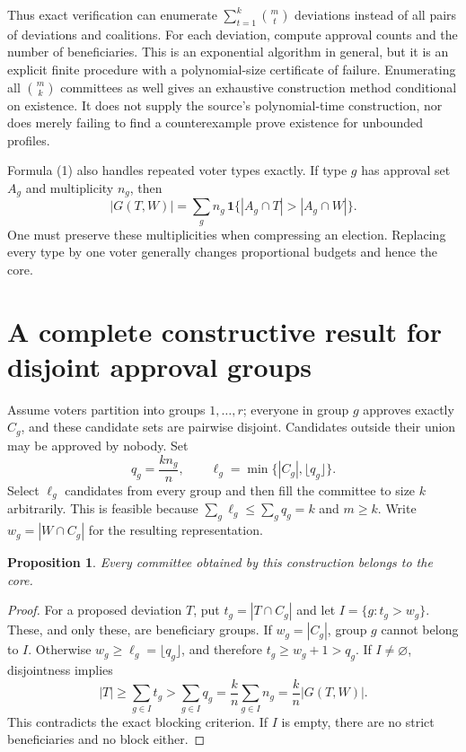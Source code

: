 \documentclass[11pt]{article}
\newtheorem{proposition}{Proposition}
\begin{document}
Thus exact verification can enumerate $\sum_{t=1}^k\binom mt$ deviations
instead of all pairs of deviations and coalitions. For each deviation,
compute approval counts and the number of beneficiaries. This is an
exponential algorithm in general, but it is an explicit finite procedure
with a polynomial-size certificate of failure. Enumerating all
$\binom mk$ committees as well gives an exhaustive construction method
conditional on existence. It does not supply the source's polynomial-time
construction, nor does merely failing to find a counterexample prove
existence for unbounded profiles.

Formula (1) also handles repeated voter types exactly. If type $g$ has
approval set $A_g$ and multiplicity $n_g$, then
\[
 |G(T,W)|=\sum_g n_g\,
 \mathbf 1\{|A_g\cap T|>|A_g\cap W|\}.
 \tag{2}
\]
One must preserve these multiplicities when compressing an election.
Replacing every type by one voter generally changes proportional budgets
and hence the core.

\section*{A complete constructive result for disjoint approval groups}
Assume voters partition into groups $1,\ldots,r$; everyone in group $g$
approves exactly $C_g$, and these candidate sets are pairwise disjoint.
Candidates outside their union may be approved by nobody. Set
\[
 q_g=\frac{k n_g}{n},\qquad
 \ell_g=\min\{|C_g|,\lfloor q_g\rfloor\}.
\]
Select $\ell_g$ candidates from every group and then fill the committee
to size $k$ arbitrarily. This is feasible because
$\sum_g\ell_g\leq\sum_g q_g=k$ and $m\geq k$. Write $w_g=|W\cap C_g|$
for the resulting representation.

\begin{proposition}
Every committee obtained by this construction belongs to the core.
\end{proposition}
\begin{proof}
For a proposed deviation $T$, put $t_g=|T\cap C_g|$ and let
$I=\{g:t_g>w_g\}$. These, and only these, are beneficiary groups. If
$w_g=|C_g|$, group $g$ cannot belong to $I$. Otherwise
$w_g\geq\ell_g=\lfloor q_g\rfloor$, and therefore
$t_g\geq w_g+1>q_g$. If $I\ne\varnothing$, disjointness implies
\[
 |T|\geq\sum_{g\in I}t_g
   >\sum_{g\in I}q_g
   =\frac{k}{n}\sum_{g\in I}n_g
   =\frac{k}{n}|G(T,W)|.
\]
This contradicts the exact blocking criterion. If $I$ is empty, there
are no strict beneficiaries and no block either.
\end{proof}
\end{document}
